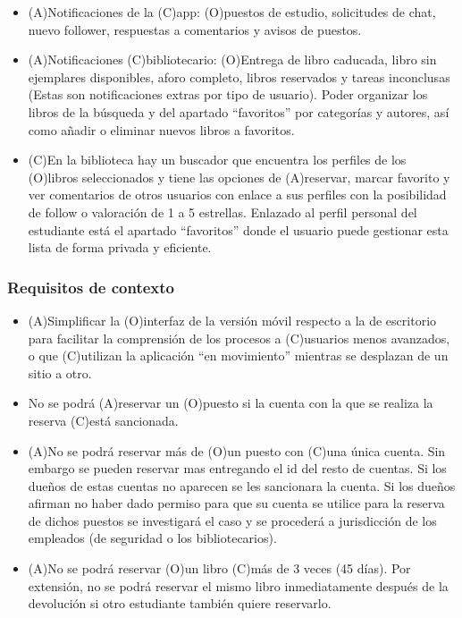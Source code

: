 \documentclass[12pt]{article}
\begin{document}
\begin{itemize}[noitemsep]
\item (A)Notificaciones de la (C)app: (O)puestos de estudio, solicitudes de chat, nuevo follower, respuestas a comentarios y avisos de puestos.
\item (A)Notificaciones (C)bibliotecario: (O)Entrega de libro caducada, libro sin ejemplares disponibles, aforo completo, libros reservados y tareas inconclusas (Estas son notificaciones extras por tipo de usuario).
\subitem Poder organizar los libros de la búsqueda y del apartado “favoritos” por categorías y autores, así como añadir o eliminar nuevos libros a favoritos.
\item (C)En la biblioteca hay un buscador que encuentra los perfiles de los (O)libros seleccionados y  tiene las opciones de (A)reservar, marcar favorito y ver comentarios de otros usuarios con enlace a sus perfiles con la posibilidad de follow o valoración de 1 a 5 estrellas.
\subitem Enlazado al perfil personal del estudiante está el apartado “favoritos” donde el usuario puede gestionar esta lista de forma privada y eficiente.
\end{itemize}

\subsubsection{Requisitos de contexto}
\begin{itemize}[noitemsep]
\item (A)Simplificar la (O)interfaz de la versión móvil respecto a la de escritorio para facilitar la comprensión de los procesos a (C)usuarios menos avanzados, o que (C)utilizan la aplicación “en movimiento” mientras se desplazan de un sitio a otro.
\item No se podrá (A)reservar un (O)puesto si la cuenta con la que se realiza la reserva (C)está sancionada.
\item (A)No se podrá reservar más de (O)un puesto con (C)una única cuenta. 
\subitem Sin embargo se pueden reservar mas entregando el id del resto de cuentas. Si los dueños de estas cuentas no aparecen se les sancionara la cuenta. Si los dueños afirman no haber dado permiso para que su cuenta se utilice para la reserva de dichos puestos se investigará el caso y se procederá a jurisdicción de los empleados (de seguridad o los bibliotecarios).
\item (A)No se podrá reservar (O)un libro (C)más de 3 veces (45 días).
\subitem Por extensión, no se podrá reservar el mismo libro inmediatamente después de la devolución si otro estudiante también quiere reservarlo.
\end{itemize}
\end{document}

